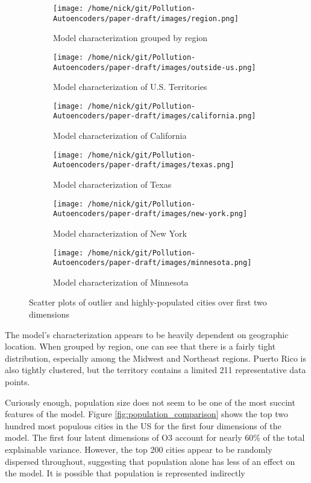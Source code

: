 \documentclass{article}
\begin{document}
\begin{figure}[h!]
\begin{subfigure}{0.5\textwidth}
    \texttt{[image: /home/nick/git/Pollution-Autoencoders/paper-draft/images/region.png]} 
    \caption{Model characterization grouped by region}
\end{subfigure}
\begin{subfigure}{0.5\textwidth}
    \texttt{[image: /home/nick/git/Pollution-Autoencoders/paper-draft/images/outside-us.png]}
    \caption{Model characterization of U.S. Territories}
\end{subfigure}
\begin{subfigure}{0.5\textwidth}
    \texttt{[image: /home/nick/git/Pollution-Autoencoders/paper-draft/images/california.png]} 
    \caption{Model characterization of California}
\end{subfigure}
\begin{subfigure}{0.5\textwidth}
    \texttt{[image: /home/nick/git/Pollution-Autoencoders/paper-draft/images/texas.png]} 
    \caption{Model characterization of Texas}
\end{subfigure}
\begin{subfigure}{0.5\textwidth}
    \texttt{[image: /home/nick/git/Pollution-Autoencoders/paper-draft/images/new-york.png]}
    \caption{Model characterization of New York}
\end{subfigure}
\begin{subfigure}{0.5\textwidth}
    \texttt{[image: /home/nick/git/Pollution-Autoencoders/paper-draft/images/minnesota.png]}
    \caption{Model characterization of Minnesota}
\end{subfigure}
\caption{Scatter plots of outlier and highly-populated cities over first two dimensions}
\label{fig:heuristic_labels}
\end{figure}

\newpage
\par The model's characterization appears to be heavily dependent on geographic location. When grouped by region, one can see that there is a fairly tight distribution, especially among the Midwest and Northeast regions. Puerto Rico is also tightly clustered, but the territory contains a limited 211 representative data points.

\par Curiously enough, population size does not seem to be one of the most succint features of the model. Figure \ref{fig:population_comparison} shows the top two hundred most populous cities in the US for the first four dimensions of the model. The first four latent dimensions of O3 account for nearly 60\% of the total explainable variance. However, the top 200 cities appear to be randomly dispersed throughout, suggesting that population alone has less of an effect on the model. It is possible that population is represented indirectly
\end{document}
